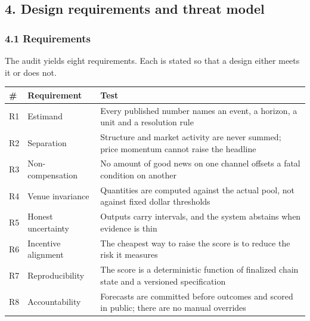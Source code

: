 \subsection{4. Design requirements and threat model}\label{design-requirements-and-threat-model}

\subsubsection{4.1 Requirements}\label{requirements}

The audit yields eight requirements. Each is stated so that a design either meets it or does not.

{\def\LTcaptype{none} %
\begin{longtable}[]{@{}
  >{\raggedright\arraybackslash}p{}
  >{\raggedright\arraybackslash}p{}
  >{\raggedright\arraybackslash}p{}@{}}
\toprule\noalign{}
\begin{minipage}[b]{\linewidth}\raggedright
\#
\end{minipage} & \begin{minipage}[b]{\linewidth}\raggedright
Requirement
\end{minipage} & \begin{minipage}[b]{\linewidth}\raggedright
Test
\end{minipage} \\
\midrule\noalign{}
\endhead
\bottomrule\noalign{}
\endlastfoot
R1 & Estimand & Every published number names an event, a horizon, a unit and a resolution rule \\
R2 & Separation & Structure and market activity are never summed; price momentum cannot raise the headline \\
R3 & Non-compensation & No amount of good news on one channel offsets a fatal condition on another \\
R4 & Venue invariance & Quantities are computed against the actual pool, not against fixed dollar thresholds \\
R5 & Honest uncertainty & Outputs carry intervals, and the system abstains when evidence is thin \\
R6 & Incentive alignment & The cheapest way to raise the score is to reduce the risk it measures \\
R7 & Reproducibility & The score is a deterministic function of finalized chain state and a versioned specification \\
R8 & Accountability & Forecasts are committed before outcomes and scored in public; there are no manual overrides \\
\end{longtable}
}

